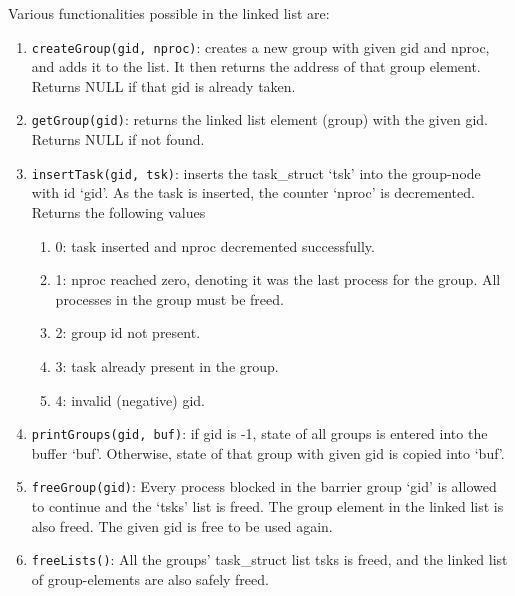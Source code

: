 Various functionalities possible in the linked list are:
\begin{enumerate}
\item \texttt{createGroup(gid, nproc)}: creates a new group with given gid and nproc, and adds it to the list. It then returns the address of that group element. Returns NULL if that gid is already taken.
\item \texttt{getGroup(gid)}: returns the linked list element (group) with the given gid. Returns NULL if not found.
\item \texttt{insertTask(gid, tsk)}: inserts the task\_struct `tsk' into the group-node with id `gid'. As the task is inserted, the counter `nproc' is decremented. Returns the following values\\
\begin{enumerate}
	\item 0: task inserted and nproc decremented successfully.\\
	\item 1: nproc reached zero, denoting it was the last process for the group. All processes in the group must be freed.\\
	\item 2: group id not present.\\
	\item 3: task already present in the group.\\
	\item 4: invalid (negative) gid.\\
\end{enumerate}
\item \texttt{printGroups(gid, buf)}: if gid is -1, state of all groups is entered into the buffer `buf'. Otherwise, state of that group with given gid is copied into `buf'.
\item \texttt{freeGroup(gid)}: Every process blocked in the barrier group `gid' is allowed to continue and the `tsks' list is freed. The group element in the linked list is also freed. The given gid is free to be used again.
\item \texttt{freeLists()}: All the groups' task\_struct list tsks is freed, and the linked list of group-elements are also safely freed.
\end{enumerate}

